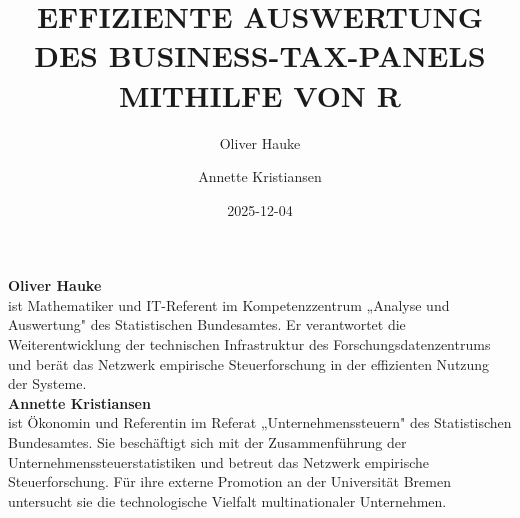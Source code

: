 \documentclass[
  german,
  10pt,
  twoside]{article}
\title{EFFIZIENTE AUSWERTUNG DES BUSINESS-TAX-PANELS MITHILFE VON R}
\author{Oliver Hauke \and Annette Kristiansen}
\date{2025-12-04}
\renewcommand{\maketitle}{}
\begin{document}
\maketitle

\begin{titlepage}
\thispagestyle{empty}
\pagestyle{empty}
\onecolumn

\noindent{\color{wistaBlue}\rule{\textwidth}{1pt}}

\vspace{-0.5cm}


\vspace*{0.5cm}

\begin{minipage}[t]{3.9cm}
%
\raggedleft
{}
\fontsize{7}{8.5}\selectfont
\vspace{0pt}%
{\fontsize{8}{9.5}\selectfont\color{wistaBlue}\textbf{Oliver Hauke}}\\[0.15cm]
ist Mathematiker und IT-Referent im Kompetenzzentrum „Analyse und Auswertung" des Statistischen Bundesamtes. Er verantwortet die Weiterentwicklung der technischen Infrastruktur des Forschungsdatenzentrums und berät das Netzwerk empirische Steuerforschung in der effizienten Nutzung der Systeme.\\[0.5cm]

{\fontsize{8}{9.5}\selectfont\color{wistaBlue}\textbf{Annette Kristiansen}}\\[0.15cm]
ist Ökonomin und Referentin im Referat „Unternehmenssteuern" des Statistischen Bundesamtes. Sie beschäftigt sich mit der Zusammenführung der Unternehmenssteuerstatistiken und betreut das Netzwerk empirische Steuerforschung. Für ihre externe Promotion an der Universität Bremen untersucht sie die technologische Vielfalt multinationaler Unternehmen.

\end{minipage}%
\hspace{0.4cm}%
\hspace{0.4cm}%
\begin{minipage}[t]{11.8cm}
\raggedright
\vspace{1.2cm}%


\end{minipage}
\end{titlepage}
\end{document}
